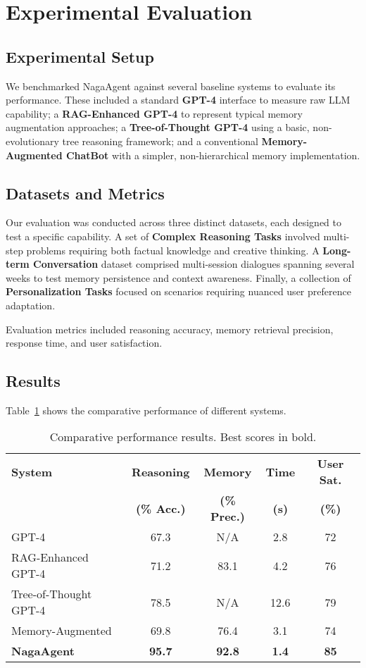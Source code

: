 \documentclass[letterpaper]{article} %
\begin{document}
\section{Experimental Evaluation}

\subsection{Experimental Setup}

We benchmarked NagaAgent against several baseline systems to evaluate its performance. These included a standard {\bfseries GPT-4} interface to measure raw LLM capability; a {\bfseries RAG-Enhanced GPT-4} to represent typical memory augmentation approaches; a {\bfseries Tree-of-Thought GPT-4} using a basic, non-evolutionary tree reasoning framework; and a conventional {\bfseries Memory-Augmented ChatBot} with a simpler, non-hierarchical memory implementation.

\subsection{Datasets and Metrics}

Our evaluation was conducted across three distinct datasets, each designed to test a specific capability. A set of {\bfseries Complex Reasoning Tasks} involved multi-step problems requiring both factual knowledge and creative thinking. A {\bfseries Long-term Conversation} dataset comprised multi-session dialogues spanning several weeks to test memory persistence and context awareness. Finally, a collection of {\bfseries Personalization Tasks} focused on scenarios requiring nuanced user preference adaptation.

Evaluation metrics included reasoning accuracy, memory retrieval precision, response time, and user satisfaction.

\subsection{Results}

Table~\ref{tab:main_results} shows the comparative performance of different systems.

\begin{table}[htb]
\centering
\begin{tabularx}{\columnwidth}{@{}Xcccc@{}}
\toprule
\textbf{System} & \textbf{Reasoning} & \textbf{Memory} & \textbf{Time} & \textbf{User Sat.} \\
& \textbf{(\% Acc.)} & \textbf{(\% Prec.)} & \textbf{(s)} & \textbf{(\%)} \\
\midrule
GPT-4 & 67.3 & N/A & 2.8 & 72 \\
RAG-Enhanced GPT-4 & 71.2 & 83.1 & 4.2 & 76 \\
Tree-of-Thought GPT-4 & 78.5 & N/A & 12.6 & 79 \\
Memory-Augmented & 69.8 & 76.4 & 3.1 & 74 \\
{\bfseries NagaAgent} & \textbf{95.7} & \textbf{92.8} & \textbf{1.4} & \textbf{85} \\
\bottomrule
\end{tabularx}
\caption{Comparative performance results. Best scores in bold.}
\label{tab:main_results}
\end{table}
\end{document}
